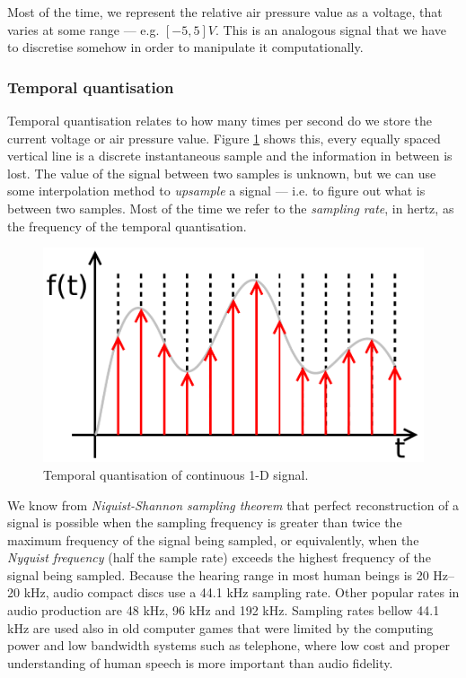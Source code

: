 Most of the time, we represent the relative air pressure value as a
voltage, that varies at some range --- e.g. $[ -5, 5 ] V$. This is an
analogous signal that we have to discretise somehow in order to
manipulate it computationally.

\subsubsection{Temporal quantisation}

Temporal quantisation relates to how many times per second do we store
the current voltage or air pressure value. Figure \ref{fig:sampled-1}
shows this, every equally spaced vertical line is a discrete
instantaneous sample and the information in between is lost. The value
of the signal between two samples is unknown, but we can use some
interpolation method to \emph{upsample} a signal --- i.e. to figure
out what is between two samples. Most of the time we refer to the
\emph{sampling rate}, in hertz, as the frequency of the temporal
quantisation.

\begin{figure}[h!]
  \centering
  \includegraphics[width=.8\textwidth]{pic/sampled-1.pdf}
  \caption{Temporal quantisation of continuous 1-D signal.}
  \label{fig:sampled-1}  
\end{figure}

We know from \emph{Niquist-Shannon sampling theorem} that perfect
reconstruction of a signal is possible when the sampling frequency is
greater than twice the maximum frequency of the signal being sampled,
or equivalently, when the \emph{Nyquist frequency} (half the sample
rate) exceeds the highest frequency of the signal being
sampled. Because the hearing range in most human beings is 20 Hz--20
kHz, audio compact discs use a 44.1 kHz sampling rate. Other popular
rates in audio production are 48 kHz, 96 kHz and 192 kHz. Sampling
rates bellow 44.1 kHz are used also in old computer games that were
limited by the computing power and low bandwidth systems such as
telephone, where low cost and proper understanding of human speech is
more important than audio fidelity.

